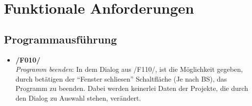 \section{Funktionale Anforderungen}

\subsection{Programmausführung}
	\begin{itemize}
		\item \textbf{/F010/}\\ \textit{Programm beenden}: In dem Dialog aus /F110/, ist die Möglichkeit gegeben, durch betätigen der "`Fenster schliesen"' Schaltfläche (Je nach BS), das Programm zu beenden. Dabei werden keinerlei Daten der Projekte, die durch den Dialog zu Auswahl stehen, verändert.
	\end{itemize}

